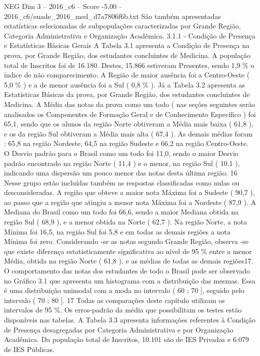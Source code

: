 \begin{textsample}{NEG Dim 3 – 2016\_c6 – Score -5.00 – 2016\_c6/enade\_2016\_med\_d7a7806f6b.txt}
São também apresentadas estatísticas selecionadas de subpopulações caracterizadas por Grande Região, Categoria Administrativa e Organização Acadêmica. 3.1.1 - Condição de Presença e Estatísticas Básicas Gerais A Tabela 3.1 apresenta a Condição de Presença na prova, por Grande Região, dos estudantes concluintes de Medicina.
A população total de Inscritos foi de 16.180.
Destes, 15.866 estiveram Presentes, sendo 1,9 \% o índice de não comparecimento.
A Região de maior ausência foi a Centro-Oeste ( 5,0 \% ) e a de menor ausência foi a Sul ( 0,8 \% ).
Já a Tabela 3.2 apresenta as Estatísticas Básicas da prova, por Grande Região, dos estudantes concluintes de Medicina.
A Média das notas da prova como um todo ( nas seções seguintes serão analisados os Componentes de Formação Geral e de Conhecimento Específico ) foi 65,1, sendo que os alunos da região Norte obtiveram a Média mais baixa ( 61,8 ), e os da região Sul obtiveram a Média mais alta ( 67,4 ).
As demais médias foram : 65,8 na região Nordeste, 64,5 na região Sudeste e 66,2 na região Centro-Oeste.
O Desvio padrão para o Brasil como um todo foi 11,0, sendo o maior Desvio padrão encontrado na região Norte ( 11,4 ) e o menor, na região Sul ( 10,1 ), indicando uma dispersão um pouco menor das notas desta última região. 16 Nesse grupo estão incluídas também as respostas classificadas como nulas ou desconsideradas.
A região que obteve a maior nota Máxima foi a Sudeste ( 90,7 ), ao passo que a região que atingiu a menor nota Máxima foi a Nordeste ( 87,9 ).
A Mediana do Brasil como um todo foi 66,6, sendo a maior Mediana obtida na região Sul ( 68,9 ), e a menor obtida na Norte ( 62,7 ).
Na região Norte, a nota Mínima foi 16,5, na região Sul foi 5,8 e em todas as demais regiões a nota Mínima foi zero.
Considerando -se as notas segundo Grande Região, observa -se que existe diferença estatisticamente significativa ao nível de 95 \% entre a menor Média, obtida na região Norte ( 61,8 ), e as médias de todas as demais regiões17.
O comportamento das notas dos estudantes de todo o Brasil pode ser observado no Gráfico 3.1 que apresenta um histograma com a distribuição das mesmas.
Essa é uma distribuição unimodal com a moda no intervalo ( 60 ; 70 ], seguido pelo intervalo ( 70 ; 80 ]. 17 Todas as comparações deste capítulo utilizam os intervalos de 95 \%.
Os erros-padrão da média que possibilitam os testes estão disponíveis nas tabelas.
A Tabela 3.3 apresenta informações referentes à Condição de Presença desagregadas por Categoria Administrativa e por Organização Acadêmica.
Da população total de Inscritos, 10.101 são de IES Privadas e 6.079 de IES Públicas.

\end{textsample}
